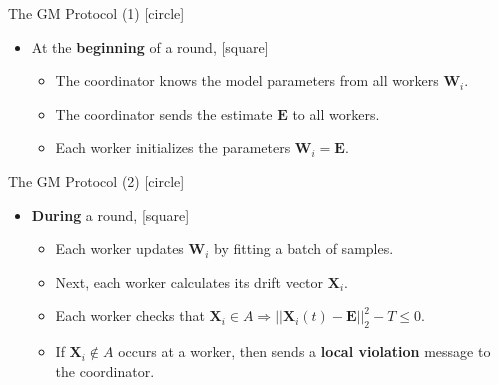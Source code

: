 \begin{frame}{The GM Protocol (1)}
    [circle]
    \begin{itemize}
        \item{At the \textbf{beginning} of a round,
        \vspace{0.2cm}
        [square]
        \begin{itemize}
            \item{The coordinator knows the model parameters from all workers $\pmb{W}_i$.}
            \vspace{0.3cm}
            \item{The coordinator sends the estimate $\pmb{E}$ to all workers.}
            \vspace{0.3cm}
            \item{Each worker initializes the parameters $\pmb{W}_i=\pmb{E}$.}
        \end{itemize}
        }
    \end{itemize}
\end{frame}

\begin{frame}{The GM Protocol (2)}
    [circle]
    \begin{itemize}
        \item{\textbf{During} a round,
        \vspace{0.2cm}
        [square]
        \begin{itemize}
            \item{Each worker updates $\pmb{W}_i$ by fitting a batch of samples.}
            \vspace{0.3cm}
            \item{Next, each worker calculates its drift vector $\pmb{X}_i$.}
            \vspace{0.3cm}
            \item{Each worker checks that $\pmb{X}_i\in A\Rightarrow||\pmb{X}_i(t)-\pmb{E}||_2^2 - T \leq 0$.}
            \vspace{0.3cm}
            \item{If $\pmb{X}_i\not\in A$ occurs at a worker, then sends a \textbf{local violation} message to the coordinator.}
        \end{itemize}
        }
    \end{itemize}
\end{frame}

